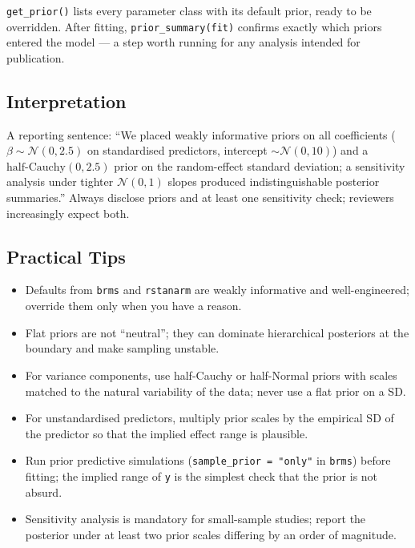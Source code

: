 \documentclass[
]{article}
\providecommand{\tightlist}{%
  \setlength{\itemsep}{0pt}\setlength{\parskip}{0pt}}
\begin{document}
\texttt{get\_prior()} lists every parameter class with its default
prior, ready to be overridden. After fitting,
\texttt{prior\_summary(fit)} confirms exactly which priors entered the
model --- a step worth running for any analysis intended for
publication.

\subsection{Interpretation}\label{interpretation}

A reporting sentence: ``We placed weakly informative priors on all
coefficients (\(\beta \sim \mathcal N(0, 2.5)\) on standardised
predictors, intercept \(\sim \mathcal N(0, 10)\)) and a
\(\mathrm{half\text{-}Cauchy}(0, 2.5)\) prior on the random-effect
standard deviation; a sensitivity analysis under tighter
\(\mathcal N(0, 1)\) slopes produced indistinguishable posterior
summaries.'' Always disclose priors and at least one sensitivity check;
reviewers increasingly expect both.

\subsection{Practical Tips}\label{practical-tips}

\begin{itemize}
\tightlist
\item
  Defaults from \texttt{brms} and \texttt{rstanarm} are weakly
  informative and well-engineered; override them only when you have a
  reason.
\item
  Flat priors are not ``neutral''; they can dominate hierarchical
  posteriors at the boundary and make sampling unstable.
\item
  For variance components, use half-Cauchy or half-Normal priors with
  scales matched to the natural variability of the data; never use a
  flat prior on a SD.
\item
  For unstandardised predictors, multiply prior scales by the empirical
  SD of the predictor so that the implied effect range is plausible.
\item
  Run prior predictive simulations (\texttt{sample\_prior\ =\ "only"} in
  \texttt{brms}) before fitting; the implied range of \texttt{y} is the
  simplest check that the prior is not absurd.
\item
  Sensitivity analysis is mandatory for small-sample studies; report the
  posterior under at least two prior scales differing by an order of
  magnitude.
\end{itemize}
\end{document}
